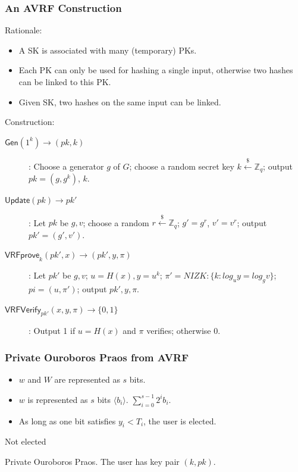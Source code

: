 \documentclass{beamer}
\begin{document}
\begin{frame}
\frametitle{An AVRF Construction}

Rationale:
\begin{itemize}
    \item A SK is associated with many (temporary) PKs.
    \item Each PK can only be used for hashing a single input, otherwise two hashes can be linked to this PK.
    \item Given SK, two hashes on the same input can be linked.
\end{itemize}

Construction:
\begin{description}
    \item[$\mathsf{Gen}(1^k) \to (pk, k)$]: Choose a generator $g$ of $G$; choose a random secret key $k \stackrel{\$}{\gets} \mathbb{Z}_q$; output $pk = (g, g^k)$, $k$.
    \item[$\mathsf{Update}(pk) \to pk'$]: Let $pk$ be $g, v$; choose a random $r \stackrel{\$}{\gets} \mathbb{Z}_q$; $g' = g^r$, $v' = v^r$; output $pk' = (g', v')$.
    \item[$\mathsf{VRFprove}_k(pk', x) \to (pk', y, \pi)$]: Let $pk'$ be $g, v$; $u = H(x), y = u^k$; $\pi' = NIZK: \{k: log_uy = log_gv\}$; $pi = (u, \pi')$; output $pk', y, \pi$.
    \item[$\mathsf{VRFVerify}_{pk'}(x, y, \pi) \to \{0, 1\}$]: Output 1 if $u = H(x)$ and $\pi$ verifies; otherwise 0.
\end{description}

\end{frame}


\begin{frame}
\frametitle{Private Ouroboros Praos from AVRF}

\begin{itemize}
    \item $w$ and $W$ are represented as $s$ bits.
    \item $w$ is represented as $s$ bits $\langle b_i \rangle$. $\sum_{i=0}^{s-1} 2^i b_i$.
    \item As long as one bit satisfies $y_i < T_i$, the user is elected.
\end{itemize}

\begin{algorithm}[H]
    \DontPrintSemicolon
    Not elected\;
    \caption{Private Ouroboros Praos. The user has key pair $(k, pk)$.}
\end{algorithm}

\end{frame}
\end{document}
